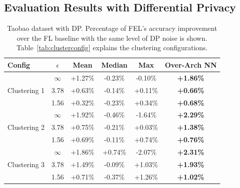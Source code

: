 \documentclass{article}
\begin{document}
\subsection{Evaluation Results with Differential Privacy}
\vspace{-0.25cm}
\label{sec:privacy-eval}

\begin{table}
\centering
\caption{\label{tab:FEAdsResultsDP} Taobao dataset with DP. Percentage of FEL's accuracy improvement over the FL baseline with the same level of DP noise is shown. Table~\ref{tab:clusterconfig} explains the clustering configurations.}
\begin{tabular}{|lc|cccc|}
\hline
Config & $\epsilon$ & Mean & Median & Max & Over-Arch NN  \\ \hline\hline
\multirow{3}{*}{Clustering 1} & $\infty$ & +1.27\% & -0.23\% & -0.10\% & \textbf{+1.86\%} \\
 & 3.78 & +0.63\% & -0.14\% & +0.11\% & \textbf{+0.66\%} \\
 & 1.56 & +0.32\% & -0.23\% & +0.34\% & \textbf{+0.68\%} \\ \hline

\multirow{3}{*}{Clustering 2} & $\infty$ & +1.92\% & -0.46\% & -1.64\% & \textbf{+2.29\%} \\
 & 3.78 & +0.75\% & -0.21\% & +0.03\% & \textbf{+1.38\%} \\
 & 1.56 & +0.69\% & -0.11\% & +0.74\% & \textbf{+0.76\%} \\ \hline
 
\multirow{3}{*}{Clustering 3} & $\infty$ & +1.86\% & +0.74\% & -2.07\% & \textbf{+2.31\%} \\
 & 3.78 & +1.49\% & -0.09\% & +1.03\% & \textbf{+1.93\%} \\
 & 1.56 & +0.71\% & -0.37\% & +1.26\% & \textbf{+1.02\%} \\ \hline
 
\end{tabular}\\
\vspace{-0.25cm}
\end{table}
\end{document}
